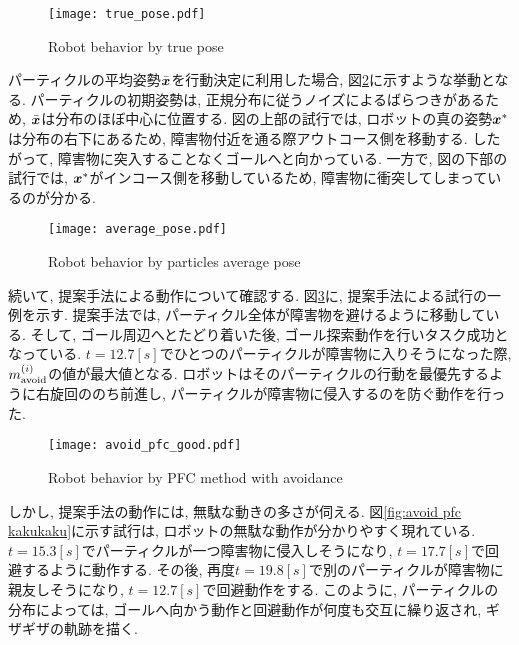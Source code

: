 \begin{figure}[H]
  \begin{center}
    \texttt{[image: true\_pose.pdf]}
    \caption{Robot behavior by true pose}
    \label{fig:true pose}
  \end{center}
\end{figure}

パーティクルの平均姿勢$\bar{\boldsymbol{x}}$を行動決定に利用した場合, 図\ref{fig:average pose}に示すような挙動となる. 
パーティクルの初期姿勢は, 正規分布に従うノイズによるばらつきがあるため, $\bar{\boldsymbol{x}}$は分布のほぼ中心に位置する. 
図の上部の試行では, ロボットの真の姿勢$\boldsymbol{x}^{*}$は分布の右下にあるため, 障害物付近を通る際アウトコース側を移動する. 
したがって, 障害物に突入することなくゴールへと向かっている. 
一方で, 図の下部の試行では, $\boldsymbol{x}^{*}$がインコース側を移動しているため, 障害物に衝突してしまっているのが分かる. 

\begin{figure}[H]
  \begin{center}
    \texttt{[image: average\_pose.pdf]}
    \caption{Robot behavior by particles average pose}
    \label{fig:average pose}
  \end{center}
\end{figure}

続いて, 提案手法による動作について確認する. 
図\ref{fig:avoid pfc good}に, 提案手法による試行の一例を示す. 
提案手法では, パーティクル全体が障害物を避けるように移動している. 
そして, ゴール周辺へとたどり着いた後, ゴール探索動作を行いタスク成功となっている. 
$t=12.7[\si{s}]$でひとつのパーティクルが障害物に入りそうになった際, $m^{(i)}_{\rm avoid}$の値が最大値となる. 
ロボットはそのパーティクルの行動を最優先するように右旋回ののち前進し, パーティクルが障害物に侵入するのを防ぐ動作を行った. 

\begin{figure}[H]
  \begin{center}
    \texttt{[image: avoid\_pfc\_good.pdf]}
    \caption{Robot behavior by PFC method with avoidance}
    \label{fig:avoid pfc good}
  \end{center}
\end{figure}

しかし, 提案手法の動作には, 無駄な動きの多さが伺える. 
図\ref{fig:avoid pfc kakukaku}に示す試行は, ロボットの無駄な動作が分かりやすく現れている. 
$t=15.3[\si{s}]$でパーティクルが一つ障害物に侵入しそうになり, $t=17.7[\si{s}]$で回避するように動作する. 
その後, 再度$t=19.8[\si{s}]$で別のパーティクルが障害物に親友しそうになり, $t=12.7[\si{s}]$で回避動作をする. 
このように, パーティクルの分布によっては, ゴールへ向かう動作と回避動作が何度も交互に繰り返され, ギザギザの軌跡を描く. 

